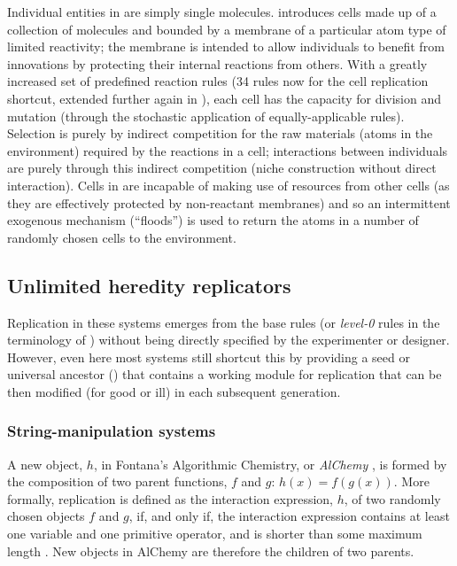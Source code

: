 Individual entities in \textcite{Hutton2002} are simply single molecules. \Textcite{Hutton2007} introduces cells made up of a collection of molecules and bounded by a membrane of a particular atom type of limited reactivity; the membrane is intended to allow individuals to benefit from innovations by protecting their internal reactions from others. With a greatly increased set of predefined reaction rules (34 rules now for the cell replication shortcut, extended further again in \textcite{Lucht2012}), each cell has the capacity for division and mutation (through the stochastic application of equally-applicable rules).  Selection is purely by indirect competition for the raw materials (atoms in the environment) required by the reactions in a cell; interactions between individuals are purely through this indirect competition (niche construction without direct interaction). Cells in \textcite{Hutton2007} are incapable of making use of resources from other cells (as they are effectively protected by non-reactant membranes) and so an intermittent exogenous mechanism (``floods'') is used to return the atoms in a number of randomly chosen cells to the environment.

\subsection{Unlimited heredity replicators}
Replication in these systems emerges from the base rules (or \textit{level-0} rules in the terminology of \textcite{BanzhafBaumgaertnerBeslonEtAl2016}) without being directly specified by the experimenter or designer. However, even here most systems still shortcut this by providing a seed or universal ancestor (\eg \textcite{Ofria2004}) that contains a working module for replication that can be then modified (for good or ill) in each subsequent generation.

\subsubsection{String-manipulation systems}

A new object, $h$, in Fontana's Algorithmic Chemistry, or \emph{AlChemy} \parencite{Fontana1992}, is formed by the composition of two parent functions, $f$ and $g$: $h(x)=f(g(x))$. More formally, replication is defined as the interaction expression, $h$, of two randomly chosen objects $f$ and $g$, if, and only if, the interaction expression contains at least one variable and one primitive operator, and is shorter than some maximum length \parencite[p.173--p.180]{Fontana1992}. New objects in AlChemy are therefore the children of two parents.

